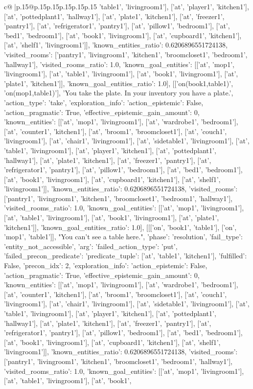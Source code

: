 \documentclass{article}
\begin{document}
{\begin{supertabular}{c@{$\;$}|p{.15\linewidth}@{}p{.15\linewidth}p{.15\linewidth}p{.15\linewidth}p{.15\linewidth}p{.15\linewidth}}
{{{'table1', 'livingroom1'], ['at', 'player1', 'kitchen1'], ['at', 'pottedplant1', 'hallway1'], ['at', 'plate1', 'kitchen1'], ['at', 'freezer1', 'pantry1'], ['at', 'refrigerator1', 'pantry1'], ['at', 'pillow1', 'bedroom1'], ['at', 'bed1', 'bedroom1'], ['at', 'book1', 'livingroom1'], ['at', 'cupboard1', 'kitchen1'], ['at', 'shelf1', 'livingroom1']], 'known_entities_ratio': 0.6206896551724138, 'visited_rooms': ['pantry1', 'livingroom1', 'kitchen1', 'broomcloset1', 'bedroom1', 'hallway1'], 'visited_rooms_ratio': 1.0, 'known_goal_entities': [['at', 'mop1', 'livingroom1'], ['at', 'table1', 'livingroom1'], ['at', 'book1', 'livingroom1'], ['at', 'plate1', 'kitchen1']], 'known_goal_entities_ratio': 1.0}}], [['on(book1,table1)', 'on(mop1,table1)'], 'You take the plate. In your inventory you have a plate.', {'action_type': 'take', 'exploration_info': {'action_epistemic': False, 'action_pragmatic': True, 'effective_epistemic_gain_amount': 0, 'known_entities': [['at', 'mop1', 'livingroom1'], ['at', 'wardrobe1', 'bedroom1'], ['at', 'counter1', 'kitchen1'], ['at', 'broom1', 'broomcloset1'], ['at', 'couch1', 'livingroom1'], ['at', 'chair1', 'livingroom1'], ['at', 'sidetable1', 'livingroom1'], ['at', 'table1', 'livingroom1'], ['at', 'player1', 'kitchen1'], ['at', 'pottedplant1', 'hallway1'], ['at', 'plate1', 'kitchen1'], ['at', 'freezer1', 'pantry1'], ['at', 'refrigerator1', 'pantry1'], ['at', 'pillow1', 'bedroom1'], ['at', 'bed1', 'bedroom1'], ['at', 'book1', 'livingroom1'], ['at', 'cupboard1', 'kitchen1'], ['at', 'shelf1', 'livingroom1']], 'known_entities_ratio': 0.6206896551724138, 'visited_rooms': ['pantry1', 'livingroom1', 'kitchen1', 'broomcloset1', 'bedroom1', 'hallway1'], 'visited_rooms_ratio': 1.0, 'known_goal_entities': [['at', 'mop1', 'livingroom1'], ['at', 'table1', 'livingroom1'], ['at', 'book1', 'livingroom1'], ['at', 'plate1', 'kitchen1']], 'known_goal_entities_ratio': 1.0}}], [[['on', 'book1', 'table1'], ['on', 'mop1', 'table1']], "You can't see a table here.", {'phase': 'resolution', 'fail_type': 'entity_not_accessible', 'arg': {'failed_action_type': 'put', 'failed_precon_predicate': {'predicate_tuple': ['at', 'table1', 'kitchen1'], 'fulfilled': False, 'precon_idx': 2}}, 'exploration_info': {'action_epistemic': False, 'action_pragmatic': True, 'effective_epistemic_gain_amount': 0, 'known_entities': [['at', 'mop1', 'livingroom1'], ['at', 'wardrobe1', 'bedroom1'], ['at', 'counter1', 'kitchen1'], ['at', 'broom1', 'broomcloset1'], ['at', 'couch1', 'livingroom1'], ['at', 'chair1', 'livingroom1'], ['at', 'sidetable1', 'livingroom1'], ['at', 'table1', 'livingroom1'], ['at', 'player1', 'kitchen1'], ['at', 'pottedplant1', 'hallway1'], ['at', 'plate1', 'kitchen1'], ['at', 'freezer1', 'pantry1'], ['at', 'refrigerator1', 'pantry1'], ['at', 'pillow1', 'bedroom1'], ['at', 'bed1', 'bedroom1'], ['at', 'book1', 'livingroom1'], ['at', 'cupboard1', 'kitchen1'], ['at', 'shelf1', 'livingroom1']], 'known_entities_ratio': 0.6206896551724138, 'visited_rooms': ['pantry1', 'livingroom1', 'kitchen1', 'broomcloset1', 'bedroom1', 'hallway1'], 'visited_rooms_ratio': 1.0, 'known_goal_entities': [['at', 'mop1', 'livingroom1'], ['at', 'table1', 'livingroom1'], ['at', 'book1', }}}
\end{supertabular}}
\end{document}
